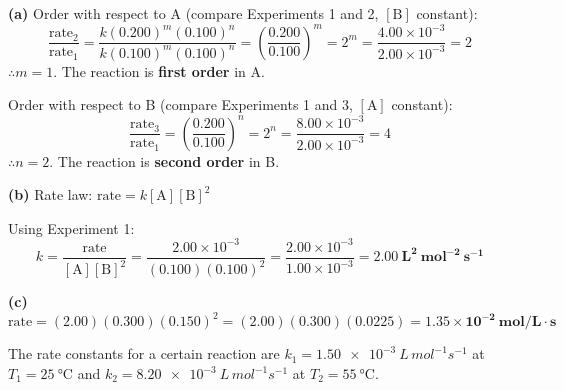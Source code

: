 \documentclass[addpoints]{exam}
\begin{document}
\begin{questions}
\begin{solution}[9cm]
\textbf{(a)} Order with respect to A (compare Experiments 1 and 2, $[\text{B}]$ constant):
\[
\frac{\text{rate}_2}{\text{rate}_1} = \frac{k(0.200)^m(0.100)^n}{k(0.100)^m(0.100)^n}
= \left(\frac{0.200}{0.100}\right)^m = 2^m = \frac{4.00\times10^{-3}}{2.00\times10^{-3}} = 2
\]
$\therefore m = 1$. The reaction is \textbf{first order} in A.

Order with respect to B (compare Experiments 1 and 3, $[\text{A}]$ constant):
\[
\frac{\text{rate}_3}{\text{rate}_1} = \left(\frac{0.200}{0.100}\right)^n = 2^n
= \frac{8.00\times10^{-3}}{2.00\times10^{-3}} = 4
\]
$\therefore n = 2$. The reaction is \textbf{second order} in B.

\textbf{(b)} Rate law: $\boxed{\text{rate} = k[\text{A}][\text{B}]^2}$

Using Experiment 1:
\[
k = \frac{\text{rate}}{[\text{A}][\text{B}]^2} = \frac{2.00\times10^{-3}}{(0.100)(0.100)^2}
= \frac{2.00\times10^{-3}}{1.00\times10^{-3}} = \mathbf{2.00\ L^2\ mol^{-2}\ s^{-1}}
\]

\textbf{(c)}
\[
\text{rate} = (2.00)(0.300)(0.150)^2 = (2.00)(0.300)(0.0225)
= \mathbf{1.35 \times 10^{-2}\ mol/L \cdot s}
\]
\end{solution}

\question The rate constants for a certain reaction are $k_1 = \SI{1.50e-3}{L\,mol^{-1}s^{-1}}$
at $T_1 = \SI{25}{\celsius}$ and $k_2 = \SI{8.20e-3}{L\,mol^{-1}s^{-1}}$ at
$T_2 = \SI{55}{\celsius}$.
\end{questions}
\end{document}
